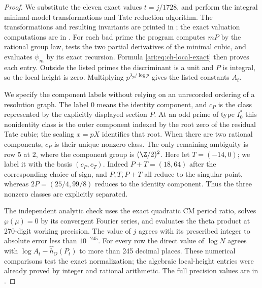 \begin{proof}
We substitute the eleven exact values $t=j/1728$, and perform
the integral minimal-model transformations and Tate reduction
algorithm. The transformations and resulting invariants are
printed in ; the exact valuation
computations are in .
For each bad prime the program computes $mP$ by the rational
group law, tests the two partial derivatives of the minimal
cubic, and evaluates $\psi_m$ by its exact recursion. Formula
\eqref{ari:eq:ch-local-exact} then proves each entry. Outside the
listed primes the discriminant is a unit and $P$ is integral,
so the local height is zero. Multiplying $p^{\lambda_p/\log p}$
gives the listed constants $A_t$.

We specify the component labels without relying on an
unrecorded ordering of a resolution graph. The label $0$
means the identity component, and $c_P$ is the class represented
by the explicitly displayed section $P$. At an odd prime of
type $I_0^*$ this nonidentity class is the outer component
indexed by the root zero of the residual Tate cubic; the
scaling $x=pX$ identifies that root. When there are two
rational components, $c_P$ is their unique nonzero class.
The only remaining ambiguity is row 5 at $2$, where the
component group is $(\Z/2)^2$. Here let $T=(-14,0)$;
we label it with the basis $(c_P,c_T)$. Indeed
$P+T=(18,64)$ after the corresponding choice of sign,
and $P,T,P+T$ all reduce to the singular point, whereas
$2P=(25/4,99/8)$ reduces to the identity component.
Thus the three nonzero classes are explicitly separated.

The independent analytic check uses the exact quadratic CM
period ratio, solves $\wp(\mu)=0$ by its convergent Fourier
series, and evaluates the theta product at 270-digit working
precision. The value of $j$ agrees with its prescribed integer
to absolute error less than $10^{-245}$. For every row the
direct value of $\log N$ agrees with
$\log A_t-\widehat h_O(P_t)$ to more than 245 decimal places.
These numerical comparisons test the exact normalization;
the algebraic local-height entries were already proved by
integer and rational arithmetic. The full precision values
are in .
\end{proof}

